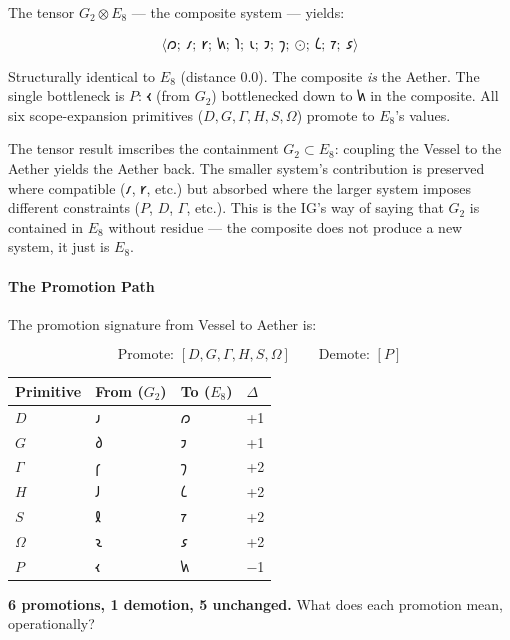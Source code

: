\documentclass[12pt,a4paper]{article}
\begin{document}
The tensor $G_2 \otimes E_8$ --- the composite system --- yields:

\[\langle 𐑼;\ 𐑥;\ 𐑾;\ 𐑿;\ 𐑐;\ 𐑧;\ 𐑲;\ 𐑠;\ ⊙;\ 𐑖;\ 𐑳;\ 𐑭 \rangle\]

Structurally identical to $E_8$ (distance 0.0). The composite \emph{is} the Aether. The single bottleneck is $P$: $𐑬$ (from $G_2$) bottlenecked down to $𐑿$ in the composite. All six scope-expansion primitives ($D, G, \Gamma, H, S, \Omega$) promote to $E_8$'s values.

The tensor result imscribes the containment $G_2 \subset E_8$: coupling the Vessel to the Aether yields the Aether back. The smaller system's contribution is preserved where compatible ($𐑥$, $𐑾$, etc.) but absorbed where the larger system imposes different constraints ($P$, $D$, $\Gamma$, etc.). This is the IG's way of saying that $G_2$ is contained in $E_8$ without residue --- the composite does not produce a new system, it just is $E_8$.

\paragraph{The Promotion Path}

The promotion signature from Vessel to Aether is:

\[\text{Promote: } [D, G, \Gamma, H, S, \Omega] \qquad \text{Demote: } [P]\]

\begin{table}[htbp]
\centering
\small
{}
\begin{tabularx}{\textwidth}{>{\centering\arraybackslash}X >{\centering\arraybackslash}X >{\centering\arraybackslash}X >{\centering\arraybackslash}X}
\toprule
\rowcolor{gray!25}\textbf{Primitive} & \textbf{From ($G_2$)} & \textbf{To ($E_8$)} & \textbf{$\Delta$} \\
\midrule
\rowcolors{1}{white}{gray!10}
$D$ & $𐑨$ & $𐑼$ & +1 \\
$G$ & $𐑔$ & $𐑲$ & +1 \\
$\Gamma$ & $𐑝$ & $𐑠$ & +2 \\
$H$ & $𐑓$ & $𐑖$ & +2 \\
$S$ & $𐑙$ & $𐑳$ & +2 \\
$\Omega$ & $𐑷$ & $𐑭$ & +2 \\
$P$ & $𐑬$ & $𐑿$ & $-$1 \\
\bottomrule
\end{tabularx}
\end{table}

\textbf{6 promotions, 1 demotion, 5 unchanged.} What does each promotion mean, operationally?
\end{document}
